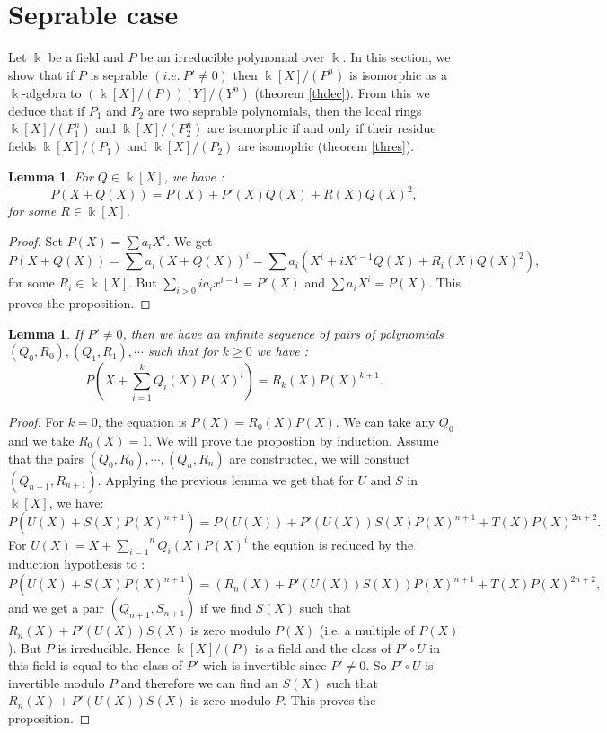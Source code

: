 \documentclass[12pt, reqno]{amsart}
\newtheorem{lemma}[theorem]{Lemma}
\newcommand{\K}{ {\Bbbk} }
\newcommand{\KP}{{\Bbbk[X]/(P_1)}}
\newcommand{\KPP}{{\Bbbk[X]/(P_2)}}
\newcommand{\KPn}{{\Bbbk[X]/(P_1^n)}}
\newcommand{\KPPn}{{\Bbbk[X]/(P_2^n)}}
\begin{document}
\section{Seprable case}\label{S1}
Let $\K$ be a field and $P$ be an irreducible polynomial over $\K$. In this section, we show that if $P$ is seprable $(i.e. \ P'\neq 0)$ then $\K[X]/(P^n)$ is isomorphic as a $\K$-algebra to $(\K[X]/(P))[Y]/(Y^n)$ (theorem \ref{thdec}). From this we deduce that if $P_1$ and $P_2$ are two seprable polynomials, then the local rings $\KPn$ and $\KPPn$ are isomorphic if and only if their residue fields $\KP$ and $\KPP$ are isomophic (theorem \ref{thres}). 

\begin{lemma}
For $Q\in \K[X]$, we have : 
$$ P(X+Q(X))=P(X)+P'(X)Q(X)+R(X)Q(X)^2,$$
for some $R\in \K[X]$.
\end{lemma}
\begin{proof}
Set $P(X)=\sum a_i X^i$. We get $$P(X+Q(X))=\sum a_i (X+Q(X))^i=\sum a_i (X^i+iX^{i-1}Q(X)+R_i(X)Q(X)^2),$$ for some $R_i \in \K[X]$. But $\underset{i>0}{\sum} ia_ix^{i-1}=P'(X)$ and $\sum a_i X^i=P(X)$. This proves the proposition.
\end{proof}

\begin{lemma}
If $P'\neq 0$, then we have an infinite sequence of pairs of polynomials $(Q_0,R_0),(Q_1,R_1),\cdots$ such that for $k\geq 0$ we have : $$ P(X+\overset{k}{\underset{i=1}{\sum}} Q_i(X)P(X)^i)=R_k(X)P(X)^{k+1}.$$
\end{lemma}
\begin{proof}
For $k=0$, the equation is $P(X)=R_0(X)P(X)$. We can take any $Q_0$ and we take $R_0(X)=1$. We will prove the propostion by induction. Assume that the pairs $(Q_0,R_0),\cdots,(Q_n,R_n)$ are constructed, we will constuct $(Q_{n+1},R_{n+1})$. Applying the previous lemma we get that for $U$ and $S$ in $\K[X]$, we have: 
$$  P(U(X)+S(X)P(X)^{n+1})=P(U(X))+P'(U(X))S(X)P(X)^{n+1}+T(X)P(X)^{2n+2}.$$
For $U(X)=X+\overset{n}{\underset{i=1}{\sum}} Q_i(X)P(X)^i$ the eqution is reduced by the induction hypothesis to : 
$$  P(U(X)+S(X)P(X)^{n+1})=(R_n(X)+P'(U(X))S(X))P(X)^{n+1}+T(X)P(X)^{2n+2},$$
and we get a pair $(Q_{n+1},S_{n+1})$ if we find $S(X)$ such that $R_n(X)+P'(U(X))S(X)$ is zero modulo $P(X)$ (i.e. a multiple of $P(X)$). But $P$ is irreducible. Hence $\K[X]/(P)$ is a field and the class of $P'\circ U$ in this field is equal to the class of $P'$ wich is invertible since $P'\neq 0$. So $P'\circ U$ is invertible modulo $P$ and therefore we can find an $S(X)$ such that  $R_n(X)+P'(U(X))S(X)$ is zero modulo $P$. This proves the proposition.
\end{proof}
\end{document}
